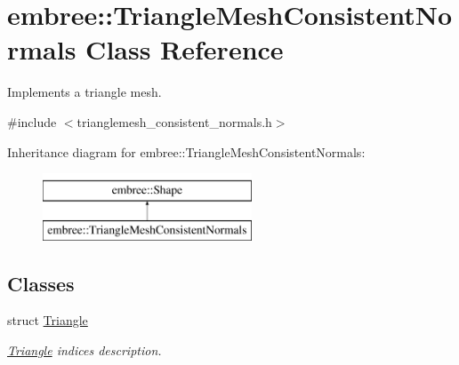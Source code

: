 \hypertarget{classembree_1_1_triangle_mesh_consistent_normals}{
\section{embree::TriangleMeshConsistentNormals Class Reference}
\label{classembree_1_1_triangle_mesh_consistent_normals}
}


Implements a triangle mesh.  




{\ttfamily \#include $<$trianglemesh\_\-consistent\_\-normals.h$>$}

Inheritance diagram for embree::TriangleMeshConsistentNormals:\begin{figure}[H]
\begin{center}
\leavevmode
\includegraphics[height=2.000000cm]{classembree_1_1_triangle_mesh_consistent_normals}
\end{center}
\end{figure}
\subsection*{Classes}
\begin{DoxyCompactItemize}
\item 
struct \hyperlink{structembree_1_1_triangle_mesh_consistent_normals_1_1_triangle}{Triangle}
\begin{DoxyCompactList}\small\item\em \hyperlink{structembree_1_1_triangle_mesh_consistent_normals_1_1_triangle}{Triangle} indices description. \item\end{DoxyCompactList}\end{DoxyCompactItemize}
